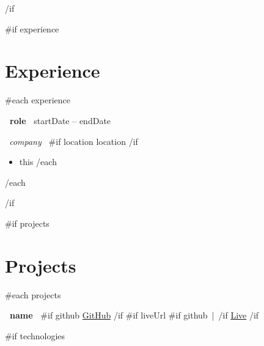 \documentclass[10pt,a4paper]{article}
\begin{document}
{{/if}}



{{#if experience}}

\section{Experience}

{{#each experience}}

\textbf{ {{~role~}} }
\hfill
{{startDate}} -- {{endDate}}

\vspace{1pt}

\textit{ {{~company~}} }
{{#if location}}
\hfill
{{location}}
{{/if}}

\vspace{-1pt}

\begin{itemize}

{{#each bullets}}
    \item {{this}}
{{/each}}

\end{itemize}

\vspace{2pt}

{{/each}}

{{/if}}


{{#if projects}}

\section{Projects}

{{#each projects}}


\noindent
\textbf{ {{~name~}} }
\hfill
{{#if github}}
\href{ {{~github~}} }{GitHub}
{{/if}}
{{#if liveUrl}}
{{#if github}}
\,|\, 
{{/if}}
\href{ {{~liveUrl~}} }{Live}
{{/if}}


{{#if technologies}}
\vspace{1pt}
\end{document}
